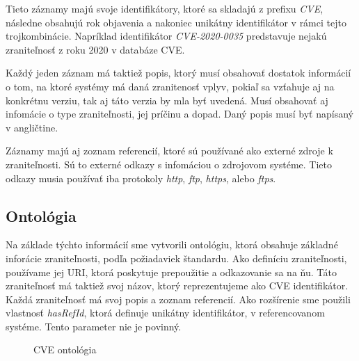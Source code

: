 \documentclass[12pt, a4paper, oneside]{book}
\begin{document}
Tieto záznamy majú svoje identifikátory, ktoré sa skladajú z prefixu \textit{CVE}, následne obsahujú rok objavenia a nakoniec unikátny identifikátor v rámci tejto trojkombinácie. Napríklad identifikátor \textit{CVE-2020-0035} predstavuje nejakú zraniteľnosť z roku 2020 v databáze CVE.


Každý jeden záznam má taktiež popis, ktorý musí obsahovať dostatok informácií o tom, na ktoré systémy má daná zranitenosť vplyv, pokiaľ sa vzťahuje aj na konkrétnu verziu, tak aj táto verzia by mla byť uvedená. Musí obsahovať aj infomácie o type zraniteľnosti, jej príčinu a dopad. Daný popis musí byť napísaný v angličtine.


Záznamy majú aj zoznam referencií, ktoré sú používané ako externé zdroje k zraniteľnosti. Sú to externé odkazy s infomáciou o zdrojovom systéme. Tieto odkazy musia používať iba protokoly \textit{http}, \textit{ftp}, \textit{https}, alebo \textit{ftps}.


\subsection{Ontológia}
Na základe týchto informácií sme vytvorili ontológiu, ktorá obsahuje základné inforácie zraniteľnosti, podľa požiadaviek štandardu. Ako definíciu zraniteľnosti, používame jej URI, ktorá poskytuje prepoužitie a odkazovanie sa na ňu. Táto zraniteľnosť má taktiež svoj názov, ktorý reprezentujeme ako CVE identifikátor. Každá zraniteľnosť má svoj popis a zoznam referencií. Ako rozšírenie sme použili vlastnosť \textit{hasRefId}, ktorá definuje unikátny identifikátor, v referencovanom systéme. Tento parameter nie je povinný.

\begin{figure}
\label{fig:semantic_web}
\caption{CVE ontológia}

\end{figure}
\end{document}

